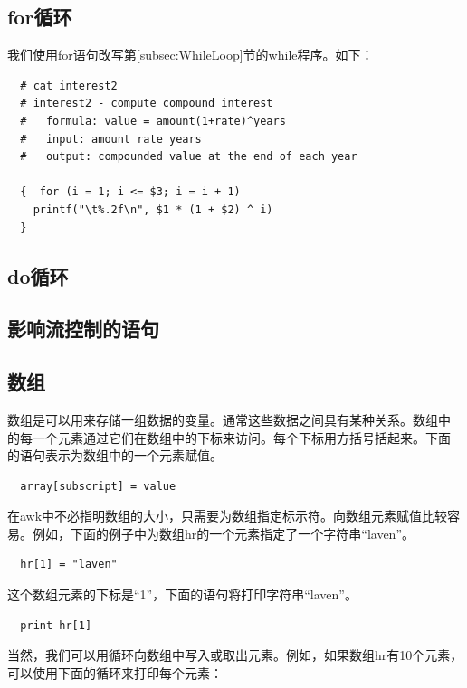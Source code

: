 \subsection{for循环}
\label{subsec:ForLoop}

我们使用for语句改写第\ref{subsec:WhileLoop}节的while程序。如下：

\begin{verbatim}
  # cat interest2
  # interest2 - compute compound interest
  #   formula: value = amount(1+rate)^years
  #   input: amount rate years
  #   output: compounded value at the end of each year
  
  {  for (i = 1; i <= $3; i = i + 1)
    printf("\t%.2f\n", $1 * (1 + $2) ^ i)
  }
\end{verbatim}

\subsection{do循环}

\subsection{影响流控制的语句}

\subsection{数组}

数组是可以用来存储一组数据的变量。通常这些数据之间具有某种关系。数组中
的每一个元素通过它们在数组中的下标来访问。每个下标用方括号括起来。下面
的语句表示为数组中的一个元素赋值。

\begin{verbatim}
  array[subscript] = value
\end{verbatim}

在awk中不必指明数组的大小，只需要为数组指定标示符。向数组元素赋值比较容
易。例如，下面的例子中为数组hr的一个元素指定了一个字符串“laven”。

\begin{verbatim}
  hr[1] = "laven"
\end{verbatim}

这个数组元素的下标是“1”，下面的语句将打印字符串“laven”。

\begin{verbatim}
  print hr[1]
\end{verbatim}

当然，我们可以用循环向数组中写入或取出元素。例如，如果数组hr有10个元素，
可以使用下面的循环来打印每个元素：

